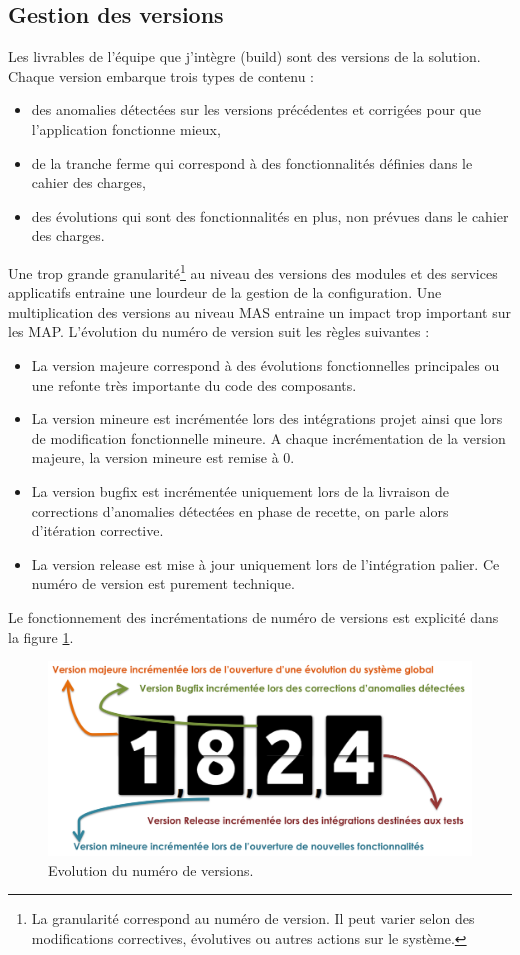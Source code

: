 \documentclass[12pt,a4paper]{article}
\begin{document}
\subsection{Gestion des versions}
Les livrables de l'équipe que j'intègre (build) sont des versions de la solution. Chaque version embarque trois types de contenu :
\smallbreak
\begin{itemize}
\item des anomalies détectées sur les versions précédentes et corrigées pour que l’application fonctionne mieux,
\item de la tranche ferme qui correspond à des fonctionnalités définies dans le cahier des charges,
\item des évolutions qui sont des fonctionnalités en plus, non prévues dans le cahier des charges.
\end{itemize}
\medbreak
Une trop grande granularité\footnote{La granularité correspond au numéro de version. Il peut varier selon des modifications correctives, évolutives ou autres actions sur le système.} au niveau des versions des modules et des services applicatifs entraine une lourdeur de la gestion de la configuration. Une multiplication des versions au niveau \gls{MAS} entraine un impact trop important sur les \gls{MAP}.
\smallbreak
L’évolution du numéro de version suit les règles suivantes :
\smallbreak
\begin{itemize}
\item	La version majeure correspond à des évolutions fonctionnelles principales ou une refonte très importante du code des composants.
\item	La version mineure est incrémentée lors des intégrations projet ainsi que lors de modification fonctionnelle mineure. A chaque incrémentation de la version majeure, la version mineure est remise à 0. 
\item	La version bugfix est incrémentée uniquement lors de la livraison de corrections d’anomalies détectées en phase de recette, on parle alors d'itération corrective.
\item	La version release est mise à jour uniquement lors de l’intégration palier. Ce numéro de version est purement technique.
\end{itemize}
\medbreak
Le fonctionnement des incrémentations de numéro de versions est explicité dans la figure \ref{versions}.
\begin{figure}[!hp]
		\begin{center}
			\includegraphics[width=\textwidth,keepaspectratio]{versions.png}
			\caption{Evolution du numéro de versions.}
			\label{versions}
		\end{center}
\end{figure}
\medbreak
\clearpage
\newpage
\end{document}
